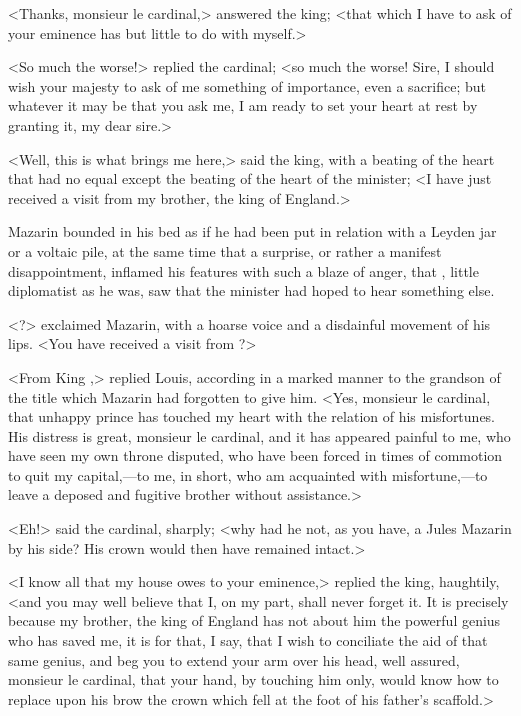 <Thanks, monsieur le cardinal,> answered the king; <that which I have to ask of your eminence has but little to do with myself.>

<So much the worse!> replied the cardinal; <so much the worse! Sire, I should wish your majesty to ask of me something of importance, even a sacrifice; but whatever it may be that you ask me, I am ready to set your heart at rest by granting it, my dear sire.>

<Well, this is what brings me here,> said the king, with a beating of the heart that had no equal except the beating of the heart of the minister; <I have just received a visit from my brother, the king of England.>

Mazarin bounded in his bed as if he had been put in relation with a Leyden jar or a voltaic pile, at the same time that a surprise, or rather a manifest disappointment, inflamed his features with such a blaze of anger, that , little diplomatist as he was, saw that the minister had hoped to hear something else.

<?> exclaimed Mazarin, with a hoarse voice and a disdainful movement of his lips. <You have received a visit from ?>

<From King ,> replied Louis, according in a marked manner to the grandson of  the title which Mazarin had forgotten to give him. <Yes, monsieur le cardinal, that unhappy prince has touched my heart with the relation of his misfortunes. His distress is great, monsieur le cardinal, and it has appeared painful to me, who have seen my own throne disputed, who have been forced in times of commotion to quit my capital,—to me, in short, who am acquainted with misfortune,—to leave a deposed and fugitive brother without assistance.>

<Eh!> said the cardinal, sharply; <why had he not, as you have, a Jules Mazarin by his side? His crown would then have remained intact.>

<I know all that my house owes to your eminence,> replied the king, haughtily, <and you may well believe that I, on my part, shall never forget it. It is precisely because my brother, the king of England has not about him the powerful genius who has saved me, it is for that, I say, that I wish to conciliate the aid of that same genius, and beg you to extend your arm over his head, well assured, monsieur le cardinal, that your hand, by touching him only, would know how to replace upon his brow the crown which fell at the foot of his father's scaffold.>

